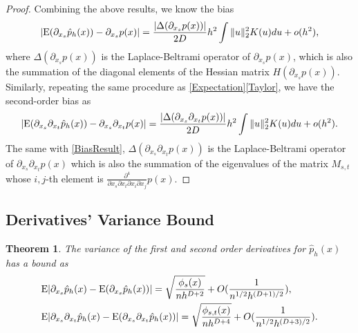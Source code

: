 \documentclass[aos,preprint]{imsart}
\newtheorem{theorem}{Theorem}[section]
\theoremstyle{remark}
\begin{document}
\begin{appendix}
\begin{proof}
Combining the above results, we know the bias
\begin{equation}\label{BiasResult}
|{\rm E}(\partial_{x_s} \hat{p}_h(x)) - \partial_{x_s}p(x)|  = \frac{|\Delta(\partial_{x_s} p(x))|}{2D} h^2 \int \|u\|_2^2 K(u) du+o(h^2),
\end{equation}
where $\Delta(\partial_{x_s} p(x))$ is the Laplace-Beltrami operator of $\partial_{x_s} p(x)$, which is also the summation of the diagonal elements of the Hessian matrix $H(\partial_{x_s}p(x))$. Similarly, repeating the same procedure as \eqref{Expectation}\eqref{Taylor}, we have the second-order bias as
\begin{equation}\label{order2}
|{\rm E}( \partial_{x_s} \partial_{x_t}   \hat{p}_h(x)) -  \partial_{x_s} \partial_{x_t} p(x)| = \frac{|\Delta(\partial_{x_s}\partial_{x_t} p(x))|}{2D} h^2 \int \|u\|_2^2 K(u) du+o(h^2).
\end{equation}
The same with \eqref{BiasResult}, $\Delta(\partial_{x_s}\partial_{x_t} p(x))$ is the Laplace-Beltrami operator of $\partial_{x_s}\partial_{x_t} p(x)$ which is also the summation of the eigenvalues of the matrix $M_{s,t}$ whose $i,j$-th element is $\frac{\partial^4}{\partial x_s\partial x_t \partial x_i \partial x_j} p(x)$.%
\end{proof}
\subsection{Derivatives' Variance Bound}\label{variance_proof}
\begin{theorem}
The variance of the first and second order derivatives for $\hat{p}_h(x)$ has a bound as 
\begin{equation*}\label{VarResult}
\begin{aligned}
&{\rm E} |\partial_{x_s} \hat{p}_h(x)-{\rm E}(\partial_{x_s} \hat{p}_h(x))| = \sqrt{\frac{\phi_s(x)}{n h^{D+2}}}+O(\frac{1}{n^{1/2}h^{(D+1)/2}}),\\
&{\rm E} | \partial_{x_s}\partial_{x_t} \hat{p}_h(x) -{\rm E}(\partial_{x_s}\partial_{x_t} \hat{p}_h(x))| = \sqrt{\frac{\phi_{s,t}(x)}{nh^{D+4}}}+O(\frac{1}{n^{1/2}h^{(D+3)/2}}).
\end{aligned}
\end{equation*}
\end{theorem}


\end{appendix}
\end{document}
